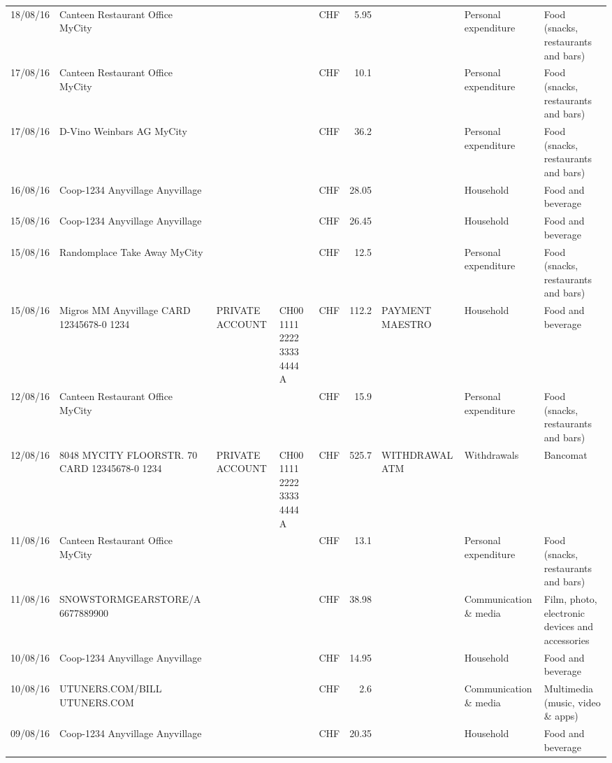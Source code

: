 \begin{landscape}
\begin{table}[h]
\begin{center}
\begin{tabular}{rllllrlll}
		18/08/16 & Canteen Restaurant Office      MyCity &       &       & CHF   & 5.95  &       & Personal expenditure & Food (snacks, restaurants and bars) \\
		17/08/16 & Canteen Restaurant Office      MyCity &       &       & CHF   & 10.1  &       & Personal expenditure & Food (snacks, restaurants and bars) \\
		17/08/16 & D-Vino Weinbars AG       MyCity &       &       & CHF   & 36.2  &       & Personal expenditure & Food (snacks, restaurants and bars) \\
		16/08/16 & Coop-1234 Anyvillage    Anyvillage &       &       & CHF   & 28.05 &       & Household & Food and beverage \\
		15/08/16 & Coop-1234 Anyvillage    Anyvillage &       &       & CHF   & 26.45 &       & Household & Food and beverage \\
		15/08/16 & Randomplace Take Away     MyCity &       &       & CHF   & 12.5  &       & Personal expenditure & Food (snacks, restaurants and bars) \\
		15/08/16 & Migros MM Anyvillage CARD 12345678-0 1234 & PRIVATE ACCOUNT & CH00 1111 2222 3333 4444 A & CHF   & 112.2 & PAYMENT MAESTRO & Household & Food and beverage \\
		12/08/16 & Canteen Restaurant Office      MyCity &       &       & CHF   & 15.9  &       & Personal expenditure & Food (snacks, restaurants and bars) \\
		12/08/16 & 8048 MYCITY FLOORSTR. 70 CARD 12345678-0 1234 & PRIVATE ACCOUNT & CH00 1111 2222 3333 4444 A & CHF   & 525.7 & WITHDRAWAL ATM & Withdrawals & Bancomat \\
		11/08/16 & Canteen Restaurant Office      MyCity &       &       & CHF   & 13.1  &       & Personal expenditure & Food (snacks, restaurants and bars) \\
		11/08/16 & SNOWSTORMGEARSTORE/A      6677889900 &       &       & CHF   & 38.98 &       & Communication \& media & Film, photo, electronic devices and accessories \\
		10/08/16 & Coop-1234 Anyvillage    Anyvillage &       &       & CHF   & 14.95 &       & Household & Food and beverage \\
		10/08/16 & UTUNERS.COM/BILL          UTUNERS.COM &       &       & CHF   & 2.6   &       & Communication \& media & Multimedia (music, video \& apps) \\
		09/08/16 & Coop-1234 Anyvillage    Anyvillage &       &       & CHF   & 20.35 &       & Household & Food and beverage \\

\end{tabular}
\end{center}
\end{table}
\end{landscape}
